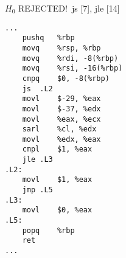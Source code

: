 \begin{figure}[H]
\begin{subfigure}[T]{0.30333333333333334\textwidth}
\begin{lrbox}{\mybox}
%
        \end{lrbox}\resizebox{\textwidth}{!}{\usebox{\mybox}}
\end{subfigure}
\begin{subfigure}[T]{0.30333333333333334\textwidth}
\caption*{}
\end{subfigure}
\begin{subfigure}[T]{0.30333333333333334\textwidth}
\caption*{}
\end{subfigure}
\hspace*{6mm}
\begin{subfigure}[T]{0.2733333333333333\textwidth}
\vspace*{2mm}\tiny {\color{red}$H_0$ REJECTED!}\ \vspace*{2mm}\tiny js [7], jle [14]
\begin{lstlisting}[style=defstyle,language={[x86masm]Assembler},basicstyle=\tiny\ttfamily,breaklines=true]
...
	pushq	%rbp
	movq	%rsp, %rbp
	movq	%rdi, -8(%rbp)
	movq	%rsi, -16(%rbp)
	cmpq	$0, -8(%rbp)
	js	.L2
	movl	$-29, %eax
	movl	$-37, %edx
	movl	%eax, %ecx
	sarl	%cl, %edx
	movl	%edx, %eax
	cmpl	$1, %eax
	jle	.L3
.L2:
	movl	$1, %eax
	jmp	.L5
.L3:
	movl	$0, %eax
.L5:
	popq	%rbp
	ret
...\end{lstlisting}
\end{subfigure}
\end{figure}
\newpage\noindent